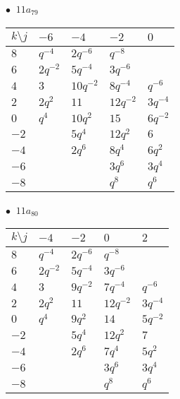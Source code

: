 \begin{minipage}{\linewidth}
$\bullet\ $ $11a_{79}$ \vspace{0.5em} \\
\begin{tabular}{l|llll}
$k \setminus j$ & $-6$ & $-4$ & $-2$ & $0$ \\
\hline
$8$ & $q^{-4}$ & $2q^{-6}$ & $q^{-8}$ &  \\
$6$ & $2q^{-2}$ & $5q^{-4}$ & $3q^{-6}$ &  \\
$4$ & $3$ & $10q^{-2}$ & $8q^{-4}$ & $q^{-6}$ \\
$2$ & $2q^{2}$ & $11$ & $12q^{-2}$ & $3q^{-4}$ \\
$0$ & $q^{4}$ & $10q^{2}$ & $15$ & $6q^{-2}$ \\
$-2$ &  & $5q^{4}$ & $12q^{2}$ & $6$ \\
$-4$ &  & $2q^{6}$ & $8q^{4}$ & $6q^{2}$ \\
$-6$ &  &  & $3q^{6}$ & $3q^{4}$ \\
$-8$ &  &  & $q^{8}$ & $q^{6}$ \\
\end{tabular}
\vspace{2em}
\end{minipage}
%
\begin{minipage}{\linewidth}
$\bullet\ $ $11a_{80}$ \vspace{0.5em} \\
\begin{tabular}{l|llll}
$k \setminus j$ & $-4$ & $-2$ & $0$ & $2$ \\
\hline
$8$ & $q^{-4}$ & $2q^{-6}$ & $q^{-8}$ &  \\
$6$ & $2q^{-2}$ & $5q^{-4}$ & $3q^{-6}$ &  \\
$4$ & $3$ & $9q^{-2}$ & $7q^{-4}$ & $q^{-6}$ \\
$2$ & $2q^{2}$ & $11$ & $12q^{-2}$ & $3q^{-4}$ \\
$0$ & $q^{4}$ & $9q^{2}$ & $14$ & $5q^{-2}$ \\
$-2$ &  & $5q^{4}$ & $12q^{2}$ & $7$ \\
$-4$ &  & $2q^{6}$ & $7q^{4}$ & $5q^{2}$ \\
$-6$ &  &  & $3q^{6}$ & $3q^{4}$ \\
$-8$ &  &  & $q^{8}$ & $q^{6}$ \\
\end{tabular}
\vspace{2em}
\end{minipage}
%

